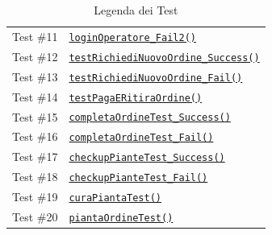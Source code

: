 \documentclass{article}
\newcommand{\code}[1]{\texttt{#1}}
\begin{document}
\begin{table}[h!]
\begin{tabular}{>{\raggedright}p{} p{}}
        Test \#11 & \hyperref[fig:snippet_LoginPersonaleControllerTest]{\code{loginOperatore\_Fail2()}}
        \label{test_11}\\
        
        Test \#12 & \hyperref[fig:snippet_ClienteControllerTest]{\code{testRichiediNuovoOrdine\_Success()}}
        \label{test_12}\\
        
        Test \#13 & \hyperref[fig:snippet_ClienteControllerTest]{\code{testRichiediNuovoOrdine\_Fail()}}
        \label{test_13}\\

        Test \#14 & \hyperref[fig:snippet_ClienteControllerTest]{\code{testPagaERitiraOrdine()}}
        \label{test_14}\\

        Test \#15 & \hyperref[fig:snippet_OperatoreControllerTest]{\code{completaOrdineTest\_Success()}}
        \label{test_15}\\

        Test \#16 & \hyperref[fig:snippet_OperatoreControllerTest]{\code{completaOrdineTest\_Fail()}}
        \label{test_16}\\

        Test \#17 & \hyperref[fig:snippet_ClienteControllerTest]{\code{checkupPianteTest\_Success()}}
        \label{test_16}\\

        Test \#18 & \hyperref[fig:snippet_OperatoreControllerTest]{\code{checkupPianteTest\_Fail()}}
        \label{test_18}\\

        Test \#19 & \hyperref[fig:snippet_OperatoreControllerTest]{\code{curaPiantaTest()}}
        \label{test_19}\\

        Test \#20 & \hyperref[fig:snippet_OperatoreControllerTest]{\code{piantaOrdineTest()}}
        \label{test_20}\\
    \end{tabular}
    \caption{Legenda dei Test}
\end{table}
\end{document}
